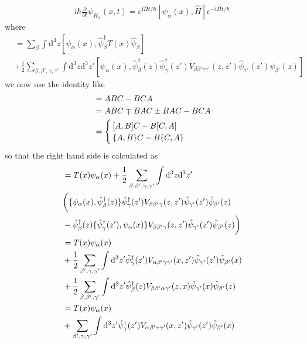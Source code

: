 \begin{align}
\mathrm{i}\hbar \frac{\partial}{\partial t} \psi_{H_{\alpha}}(x,t)=e^{\mathrm{i}\hat Ht/\hbar}[\psi_{\alpha}(x),\hat H]e^{-\mathrm{i}\hat Ht/\hbar} \nonumber
\end{align}
where
\begin{align}
[\psi_{\alpha}(x),\hat H]&=\sum_{\beta} \int \mathrm{d}^3z[\psi_{\alpha}(x),\hat \psi^{\dagger}_{\beta}T(x)\hat \psi_{\beta}] \nonumber \\
&+\frac{1}{2}\sum_{\beta,\beta',\gamma,\gamma'}\int \mathrm{d}^3z\mathrm{d}^3z'[\psi_{\alpha}(x),
\hat \psi^{\dagger}_{\beta}(z)\hat \psi^{\dagger}_{\gamma}(z')V_{\beta\beta'\gamma\gamma'}(z,z')\hat \psi_{\gamma'}(z')\hat \psi_{\beta'}(z)
] \nonumber
\end{align}
we now use the identity like
\begin{align}
[A,BC]&=ABC-BCA \nonumber \\	
&=ABC\mp BAC\pm BAC -BCA \nonumber \\
&=\begin{cases}
[A,B]C-B[C,A] \cr \{A,B\}C-B\{C,A\}
\end{cases}\nonumber
\end{align}
so that the right hand side is calculated as
\begin{align}
[\psi_{\alpha}(x),\hat H]&=T(x)\psi_{\alpha}(x)+\frac{1}{2}\sum_{\beta,\beta',\gamma,\gamma'}\int \mathrm{d}^3z\mathrm{d}^3z'
\nonumber \\
&\bigg{(}\{\psi_{\alpha}(x),
\hat \psi^{\dagger}_{\beta}(z)\}\hat \psi^{\dagger}_{\gamma}(z')V_{\beta\beta'\gamma}(z,z')\hat \psi_{\gamma'}(z')\hat \psi_{\beta'}(z)\nonumber \\
&-\hat \psi^{\dagger}_{\beta}(z)\{\hat \psi^{\dagger}_{\gamma}(z'),\psi_{\alpha}(x)\}V_{\beta\beta'\gamma}(z,z')\hat \psi_{\gamma'}(z')\hat \psi_{\beta'}(z) \bigg{)}\nonumber \\
&=T(x)\psi_{\alpha}(x)\nonumber \\
&+\frac{1}{2}\sum_{\beta',\gamma,\gamma'}\int \mathrm{d}^3z'\hat \psi^{\dagger}_{\gamma}(z')V_{\alpha\beta'\gamma\gamma'}(x,z')\hat \psi_{\gamma'}(z')\hat \psi_{\beta'}(x) \nonumber\\
&+\frac{1}{2}\sum_{\beta,\beta',\gamma'}\int \mathrm{d}^3z'\hat \psi^{\dagger}_{\beta}(z)V_{\beta\beta'\alpha\gamma'}(z,x)\hat \psi_{\gamma'}(x)\hat \psi_{\beta'}(z) \nonumber\\
&=T(x)\psi_{\alpha}(x) \nonumber \\
&+\sum_{\beta',\gamma,\gamma'}\int \mathrm{d}^3z'\hat \psi^{\dagger}_{\gamma}(z')V_{\alpha\beta'\gamma\gamma'}(x,z')\hat \psi_{\gamma'}(z')\hat \psi_{\beta'}(x) \nonumber
\end{align}
